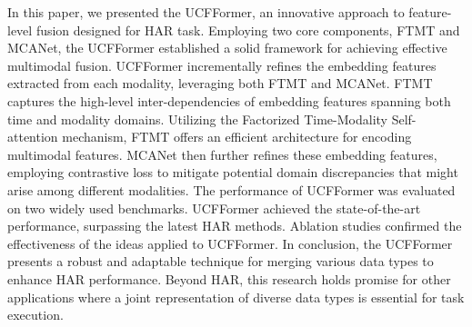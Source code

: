 In this paper, we presented the UCFFormer, an innovative approach to feature-level fusion designed for HAR task. Employing two core components, FTMT  and MCANet, the UCFFormer established a solid framework for achieving effective multimodal fusion.
UCFFormer incrementally refines the embedding features extracted from each modality, leveraging both FTMT and MCANet.
FTMT captures the high-level inter-dependencies of embedding features spanning both time and modality domains. Utilizing the Factorized Time-Modality Self-attention mechanism, FTMT offers an efficient architecture for encoding multimodal features. MCANet then further refines these embedding features, employing contrastive loss to mitigate potential domain discrepancies that might arise among different modalities.
The performance of UCFFormer was evaluated on two widely used benchmarks. UCFFormer achieved the state-of-the-art performance, surpassing the latest HAR methods.
Ablation studies confirmed the effectiveness of the ideas applied to UCFFormer. 
In conclusion, the UCFFormer presents a robust and adaptable technique for merging various data types to enhance HAR performance. Beyond HAR, this research holds promise for other applications where a joint representation of diverse data types is essential for task execution.